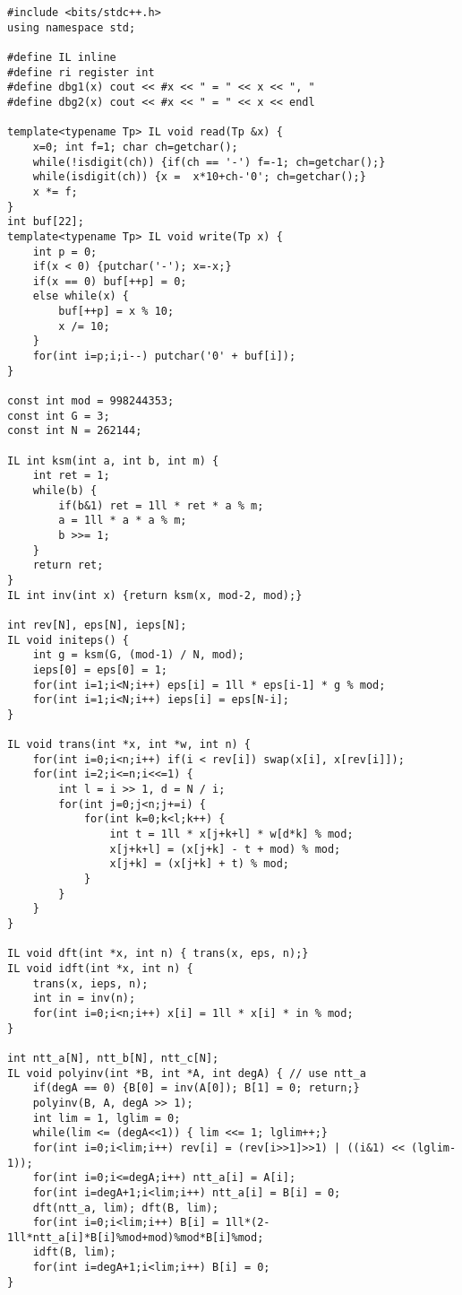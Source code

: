 \documentclass[UTF8]{ctexart}
\begin{document}
\begin{framed}
\begin{lstlisting}
#include <bits/stdc++.h>
using namespace std;

#define IL inline
#define ri register int 
#define dbg1(x) cout << #x << " = " << x << ", "
#define dbg2(x) cout << #x << " = " << x << endl

template<typename Tp> IL void read(Tp &x) {
    x=0; int f=1; char ch=getchar();
    while(!isdigit(ch)) {if(ch == '-') f=-1; ch=getchar();}
    while(isdigit(ch)) {x =  x*10+ch-'0'; ch=getchar();}
    x *= f;
}
int buf[22];
template<typename Tp> IL void write(Tp x) {
    int p = 0;
    if(x < 0) {putchar('-'); x=-x;}
    if(x == 0) buf[++p] = 0;
    else while(x) {
        buf[++p] = x % 10;
        x /= 10;
    }
    for(int i=p;i;i--) putchar('0' + buf[i]);
}

const int mod = 998244353;
const int G = 3;
const int N = 262144;

IL int ksm(int a, int b, int m) {
    int ret = 1;
    while(b) {
        if(b&1) ret = 1ll * ret * a % m;
        a = 1ll * a * a % m;
        b >>= 1;
    }
    return ret;
}
IL int inv(int x) {return ksm(x, mod-2, mod);}

int rev[N], eps[N], ieps[N];
IL void initeps() {
    int g = ksm(G, (mod-1) / N, mod);
    ieps[0] = eps[0] = 1;
    for(int i=1;i<N;i++) eps[i] = 1ll * eps[i-1] * g % mod;
    for(int i=1;i<N;i++) ieps[i] = eps[N-i];
}

IL void trans(int *x, int *w, int n) {
    for(int i=0;i<n;i++) if(i < rev[i]) swap(x[i], x[rev[i]]);
    for(int i=2;i<=n;i<<=1) {
        int l = i >> 1, d = N / i;
        for(int j=0;j<n;j+=i) {
            for(int k=0;k<l;k++) {
                int t = 1ll * x[j+k+l] * w[d*k] % mod;
                x[j+k+l] = (x[j+k] - t + mod) % mod;
                x[j+k] = (x[j+k] + t) % mod;
            }
        }
    }
}

IL void dft(int *x, int n) { trans(x, eps, n);}
IL void idft(int *x, int n) { 
    trans(x, ieps, n);
    int in = inv(n);
    for(int i=0;i<n;i++) x[i] = 1ll * x[i] * in % mod;
}

int ntt_a[N], ntt_b[N], ntt_c[N];
IL void polyinv(int *B, int *A, int degA) { // use ntt_a
    if(degA == 0) {B[0] = inv(A[0]); B[1] = 0; return;}
    polyinv(B, A, degA >> 1);
    int lim = 1, lglim = 0;
    while(lim <= (degA<<1)) { lim <<= 1; lglim++;}
    for(int i=0;i<lim;i++) rev[i] = (rev[i>>1]>>1) | ((i&1) << (lglim-1));
    for(int i=0;i<=degA;i++) ntt_a[i] = A[i];
    for(int i=degA+1;i<lim;i++) ntt_a[i] = B[i] = 0;
    dft(ntt_a, lim); dft(B, lim);
    for(int i=0;i<lim;i++) B[i] = 1ll*(2-1ll*ntt_a[i]*B[i]%mod+mod)%mod*B[i]%mod;
    idft(B, lim);
    for(int i=degA+1;i<lim;i++) B[i] = 0;
}


\end{lstlisting}
\end{framed}
\end{document}
